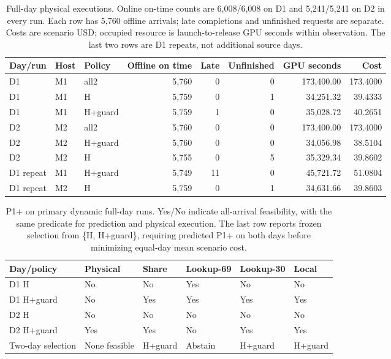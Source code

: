 \begin{table}[t]
\centering\small
\caption{Full-day physical executions. Online on-time counts are 6,008/6,008
on D1 and 5,241/5,241 on D2 in every run. Each row has 5,760 offline arrivals;
late completions and unfinished requests are separate. Costs are scenario USD;
occupied resource is launch-to-release GPU seconds within observation. The
last two rows are D1 repeats, not additional source days.}
\label{tab:full-day-physical}
\par\vspace{4pt}
\begin{tabular*}{\textwidth}{@{\extracolsep{\fill}}lllrrrrr@{}}
\toprule
Day/run & Host & Policy & Offline on time & Late & Unfinished & GPU seconds & Cost\\
\midrule
D1 & M1 & all2 & 5,760 & 0 & 0 & 173,400.00 & 173.4000\\
D1 & M1 & H & 5,759 & 0 & 1 & 34,251.32 & 39.4333\\
D1 & M1 & H+guard & 5,759 & 1 & 0 & 35,028.72 & 40.2651\\
D2 & M2 & all2 & 5,760 & 0 & 0 & 173,400.00 & 173.4000\\
D2 & M2 & H+guard & 5,760 & 0 & 0 & 34,056.98 & 38.5104\\
D2 & M2 & H & 5,755 & 0 & 5 & 35,329.34 & 39.8602\\
\midrule
D1 repeat & M1 & H+guard & 5,749 & 11 & 0 & 45,721.72 & 51.0804\\
D1 repeat & M2 & H & 5,759 & 0 & 1 & 34,631.66 & 39.8603\\
\bottomrule
\end{tabular*}
\end{table}

\begin{table}[t]
\centering\small
\caption{P1+ on primary dynamic full-day runs. Yes/No indicate all-arrival
feasibility, with the same predicate for prediction and physical execution.
The last row reports frozen selection from \{H, H+guard\}, requiring predicted
P1+ on both days before minimizing equal-day mean scenario cost.}
\label{tab:full-day-prediction}
\par\vspace{4pt}
\begin{tabular*}{\textwidth}{@{\extracolsep{\fill}}llllll@{}}
\toprule
Day/policy & Physical & Share & Lookup-69 & Lookup-30 & Local\\
\midrule
D1 H & No & No & Yes & No & No\\
D1 H+guard & No & Yes & Yes & Yes & Yes\\
D2 H & No & No & No & No & No\\
D2 H+guard & Yes & Yes & No & Yes & Yes\\
\midrule
Two-day selection & None feasible & H+guard & Abstain & H+guard & H+guard\\
\bottomrule
\end{tabular*}
\end{table}

